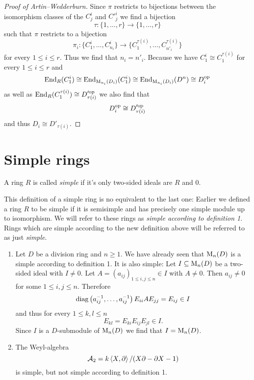 \begin{proof}[Proof of Artin--Wedderburn]
  Since $\pi$ restricts to bijections between the isomorphism classes of the $C^i_j$ and $C'^i_j$ we find a bijection
  \[
            \tau
    \colon  \{1, \dotsc, r\}
    \to     \{1, \dotsc, r\}
  \]
  such that $\pi$ restricts to a bijection
  \[
            \pi_i
    \colon  \{ C^i_1, \dotsc, C^i_{n_i} \}
    \to     \{ C^{\tau(i)}_1, \dotsc, C^{\tau(i)}_{n'_i} \}
  \]
  for every $1 \leq i \leq r$.
  Thus we find that $n_i = n'_i$.
  Because we have $C^i_1 \cong C^{\tau(i)}_1$ for every $1 \leq i \leq r$ and
  \[
          \operatorname{End}_R(C^i_1)
    \cong \operatorname{End}_{\operatorname{M}_{n_i}(D_i)}(C^i_1)
    \cong \operatorname{End}_{\operatorname{M}_{n_i}(D_i)}(D^n)
    \cong D_i^{\mathrm{op}}
  \]
  as well as $\operatorname{End}_R(C^{\tau(i)}_1) \cong D_{\tau(i)}'^{\mathrm{op}}$ we also find that
  \[
          D_i^{\mathrm{op}}
    \cong D_{\tau(i)}'^{\mathrm{op}}
  \]
  and thus $D_i \cong D'_{\tau(i)}$.
\end{proof}





\section{Simple rings}


\begin{defi}
  A ring $R$ is called \emph{simple} if it’s only two-sided ideals are $R$ and $0$.
\end{defi}


\begin{warn}
  This definition of a simple ring is no equivalent to the last one:
  Earlier we defined a ring $R$ to be simple if it is semisimple and has precisely one simple module up to isomorphism.
  We will refer to these rings as \emph{simple according to definition 1}.
  Rings which are simple according to the new definition above will be referred to as just \emph{simple}.
\end{warn}


\begin{expls}
  \begin{enumerate}[label=\emph{\alph*)},leftmargin=*]
    \item
      Let $D$ be a division ring and $n \geq 1$.
      We have already seen that $\operatorname{M}_n(D)$ is a simple according to definition 1.
      It is also simple:
      Let $I \subseteq \operatorname{M}_n(D)$ be a two-sided ideal with $I \neq 0$.
      Let $A = (a_{ij})_{1 \leq i,j \leq n} \in I$ with $A \neq 0$.
      Then $a_{ij} \neq 0$ for some $1 \leq i,j \leq n$.
      Therefore
      \[
          \operatorname{diag}\left( a_{ij}^{-1}, \dotsc, a_{ij}^{-1} \right) E_{ii} A E_{jj}
        = E_{ij} \in I
      \]
      and thus for every $1 \leq k,l \leq n$
      \[
            E_{kl}
        =   E_{ki} E_{ij} E_{jl}
        \in I.
      \]
      Since $I$ is a $D$-submodule of $\operatorname{M}_n(D)$ we find that $I = \operatorname{M}_n(D)$.
    \item
      The Weyl-algebra
      \[
          \mathcal{A}_2
        = k \left\langle X,\partial \right\rangle / (X \partial - \partial X - 1)
      \]
      is simple, but not simple according to definition 1.
  \end{enumerate}
\end{expls}


